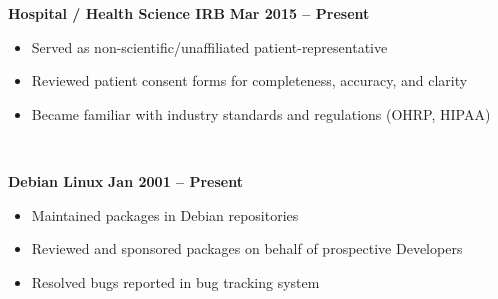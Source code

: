 \documentclass[10pt,a4paper]{article}
\newcommand{\cvproject}[4]{
    \textbf{#1} \hfill \textbf{#2} \\
    #3 \\
    #4
    \vspace{0.3em}
}
\begin{document}
    \cvproject{Hospital / Health Science IRB}{Mar 2015 – Present}{
        \begin{itemize}
            \item Served as non-scientific/unaffiliated patient-representative
            \item Reviewed patient consent forms for completeness, accuracy, and clarity
            \item Became familiar with industry standards and regulations (OHRP, HIPAA)
        \end{itemize}
    }{}

    \cvproject{Debian Linux}{Jan 2001 – Present}{
        \begin{itemize}
            \item Maintained packages in Debian repositories
            \item Reviewed and sponsored packages on behalf of prospective Developers
            \item Resolved bugs reported in bug tracking system
        \end{itemize}
    }{}
\end{document}
